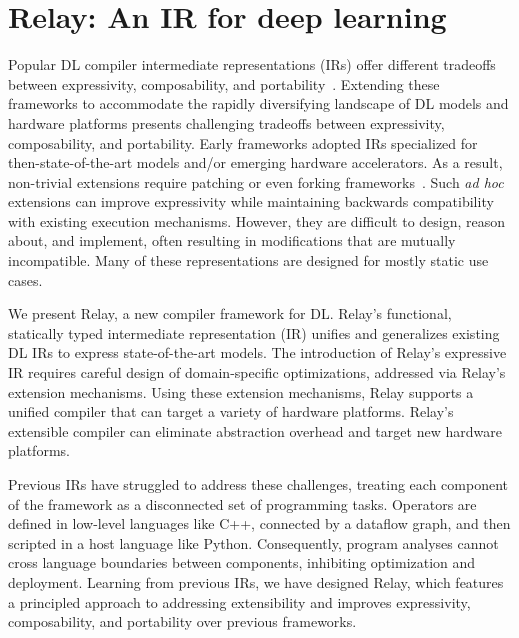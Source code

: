 \chapter{Relay: An IR for deep learning}
\label{ch:relay}

Popular DL compiler intermediate representations (IRs) offer different tradeoffs
between expressivity, composability, and portability~\citep{
  tensorflow, pytorch_ad, chainer_learningsys2015, tangent, theano, glow}.
Extending these frameworks to accommodate
  the rapidly diversifying landscape of
  DL models and hardware platforms presents
  challenging tradeoffs between
  expressivity, composability, and portability.
Early frameworks adopted IRs
  specialized for then-state-of-the-art models and/or
  emerging hardware accelerators.
As a result, non-trivial extensions require
  patching or even forking frameworks~\citep{
    tf_fold, tf_lite, tangent, tf_eager, xla, glow, torchscript}.
Such \textit{ad hoc} extensions can improve expressivity
  while maintaining backwards compatibility with existing execution mechanisms.
However, they are difficult to design, reason about, and implement,
  often resulting in modifications that are mutually incompatible.
Many of these representations are designed for mostly static
  use cases.

We present Relay,
  a new compiler framework for DL.
Relay's functional, statically typed intermediate representation (IR)
  unifies and generalizes existing DL IRs
  to express state-of-the-art models.
The introduction of Relay's expressive IR requires
  careful design of domain-specific optimizations,
  addressed via Relay's extension mechanisms.
Using these extension mechanisms,
  Relay supports a unified compiler that
  can target a variety of hardware platforms.
Relay's extensible compiler
   can eliminate abstraction overhead and
   target new hardware platforms.

Previous IRs have struggled to address these challenges, treating each
  component of the framework as a disconnected set of programming tasks.
Operators are defined in low-level languages like C++,
  connected by a dataflow graph, and then scripted
  in a host language like Python.
Consequently,
  program analyses cannot cross language boundaries between components,
  inhibiting optimization and deployment.
Learning from previous IRs, we have designed Relay,
  which features a principled approach to addressing extensibility
  and improves expressivity, composability, and portability
  over previous frameworks.


